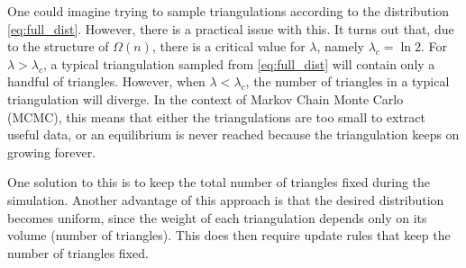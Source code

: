 One could imagine trying to sample triangulations according to the distribution \eqref{eq:full_dist}. However, there is a practical issue with this. It turns out that, due to the structure of $\Omega(n)$, there is a critical value for $\lambda$, namely $\lambda_c = \ln 2$. For $\lambda > \lambda_c$, a typical triangulation sampled from \eqref{eq:full_dist} will contain only a handful of triangles. However, when $\lambda < \lambda_c$, the number of triangles in a typical triangulation will diverge. In the context of Markov Chain Monte Carlo (MCMC), this means that either the triangulations are too small to extract useful data, or an equilibrium is never reached because the triangulation keeps on growing forever.

One solution to this is to keep the total number of triangles fixed during the simulation. Another advantage of this approach is that the desired distribution becomes uniform, since the weight of each triangulation depends only on its volume (number of triangles). This does then require update rules that keep the number of triangles fixed.